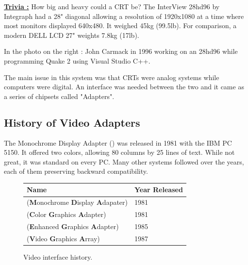 \documentclass[book.tex]{subfiles}
\begin{document}
\begin{minipage}{.4\textwidth}
\textbf{\underline{Trivia :}} How big and heavy could a CRT be? The InterView 28hd96 by Integraph had a 28" diagonal allowing a resolution of 1920x1080 at a time where most monitors displayed 640x480. It weighed 45kg (99.5lb). For comparison, a modern DELL LCD 27" weights 7.8kg (17lb).\\
\par
In the photo on the right : John Carmack in 1996 working on an 28hd96 while programming Quake 2 using Visual Studio C++.\\
\end{minipage}
\begin{minipage}{.6\textwidth}
\begin{figure}[H]
  \begin{flushright}
    \end{flushright}
\end{figure}
\end{minipage}

\par
The main issue in this system was that CRTs were analog systems while computers were digital. An interface was needed between the two and it came as a series of chipsets called "Adapters". 

  \subsection{History of Video Adapters}

The Monochrome Display Adapter () was released in 1981 with the IBM PC 5150. It offered two colors, allowing 80 columns by 25 lines of text.  While not great, it was standard on every PC. Many other systems followed over the years, each of them preserving backward compatibility.
\bigskip
  
 \begin{figure}[H]
\centering  
\begin{tabularx}{\textwidth}{ X  Y }
  \toprule
  \textbf{Name} &  \textbf{Year Released} \\
  \toprule {}
   (\textbf{M}onochrome
   \textbf{D}isplay
   \textbf{A}dapater) & 1981 
   \\ 
   (\textbf{C}olor
   \textbf{G}raphics
   \textbf{A}dapter) & 1981 
    \\ 
   (\textbf{E}nhanced
   \textbf{G}raphics
   \textbf{A}dapter) & 1985
   \\ 
   (\textbf{V}ideo
   \textbf{G}raphics
   \textbf{A}rray)  & 1987
    \\
  \toprule
\end{tabularx}
\caption{Video interface history.}\label{fig:vga_history}
\end{figure}
\end{document}
